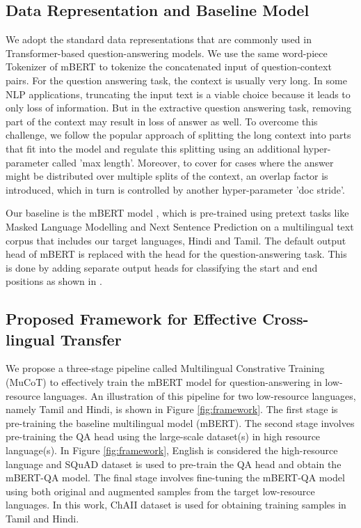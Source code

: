 \documentclass[11pt]{article}
\begin{document}
\subsection{Data Representation and Baseline Model}    

We adopt the standard data representations that are commonly used in Transformer-based question-answering models. We use the same word-piece Tokenizer of mBERT to tokenize the concatenated input of question-context pairs. For the question answering task, the context is usually very long. In some NLP applications, truncating the input text is a viable choice because it leads to only loss of information. But in the extractive question answering task, removing part of the context may result in loss of answer as well. To overcome this challenge, we follow the popular approach of splitting the long context into parts that fit into the model and regulate this splitting using an additional hyper-parameter called 'max length'. Moreover, to cover for cases where the answer might be distributed over multiple splits of the context, an overlap factor is introduced, which in turn is controlled by another hyper-parameter 'doc stride'.

Our baseline is the mBERT model \cite{devlin2018bert}, which is pre-trained using pretext tasks like Masked Language Modelling and Next Sentence Prediction on a multilingual text corpus that includes our target languages, Hindi and Tamil. The default output head of mBERT is replaced with the head for the question-answering task. This is done by adding separate output heads for classifying the start and end positions as shown in \citet{devlin2018bert}.









\subsection{Proposed Framework for Effective Cross-lingual Transfer}

We propose a three-stage pipeline called Multilingual Constrative Training (MuCoT) to effectively train the mBERT model for question-answering in low-resource languages. An illustration of this pipeline for two low-resource languages, namely Tamil and Hindi, is shown in Figure \ref{fig:framework}. The first stage is pre-training the baseline multilingual model (mBERT). The second stage involves pre-training the QA head using the large-scale dataset(s) in high resource language(s). In Figure \ref{fig:framework}, English is considered the high-resource language and SQuAD \cite{rajpurkar2016SQuAD} dataset is used to pre-train the QA head and obtain the mBERT-QA model. The final stage involves fine-tuning the mBERT-QA model using both original and augmented samples from the target low-resource languages. In this work, ChAII \cite{ChAII} dataset is used for obtaining training samples in Tamil and Hindi.
\end{document}
